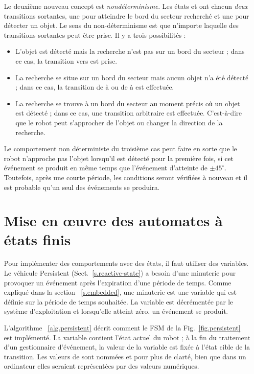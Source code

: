 Le deuxième nouveau concept est \emph{nondéterminisme}. Les états  et  ont chacun \emph{deux} transitions sortantes, une pour atteindre le bord du secteur recherché et une pour détecter un objet. Le sens du non-déterminisme est que n'importe laquelle des transitions sortantes peut être prise. Il y a trois possibilités :
\begin{itemize}
\item L'objet est détecté mais la recherche n'est pas sur un bord du secteur ; dans ce cas, la transition vers  est prise.
\item La recherche se situe sur un bord du secteur mais aucun objet n'a été détecté ; dans ce cas, la transition de  à  ou de  à  est effectuée.
\item La recherche se trouve à un bord du secteur au moment précis où un objet est détecté ; dans ce cas, une transition arbitraire est effectuée. C'est-à-dire que le robot peut s'approcher de l'objet ou changer la direction de la recherche.
\end{itemize}
Le comportement non déterministe du troisième cas peut faire en sorte que le robot n'approche pas l'objet lorsqu'il est détecté pour la première fois, si cet événement se produit en même temps que l'événement d'atteinte de $\pm 45^\circ$. Toutefois, après une courte période, les conditions seront vérifiées à nouveau et il est probable qu'un seul des événements se produira.

\section{Mise en œuvre des automates à états finis}\label{s.fsm-implementation}

Pour implémenter des comportements avec des états, il faut utiliser des variables. Le véhicule Persistent (Sect.~\ref{s.reactive-state}) a besoin d'une minuterie pour provoquer un événement après l'expiration d'une période de temps. Comme expliqué dans la section ~\ref{s.embedded}, une minuterie est une variable qui est définie sur la période de temps souhaitée. La variable est décrémentée par le système d'exploitation et lorsqu'elle atteint zéro, un événement se produit.

L'algorithme ~\ref{alg.persistent} décrit comment le FSM de la Fig.~\ref{fig.persistent} est implémenté. La variable  contient l'état actuel du robot ; à la fin du traitement d'un gestionnaire d'événement, la valeur de la variable est fixée à l'état cible de la transition. Les valeurs de  sont nommées  et  pour plus de clarté, bien que dans un ordinateur elles seraient représentées par des valeurs numériques.

